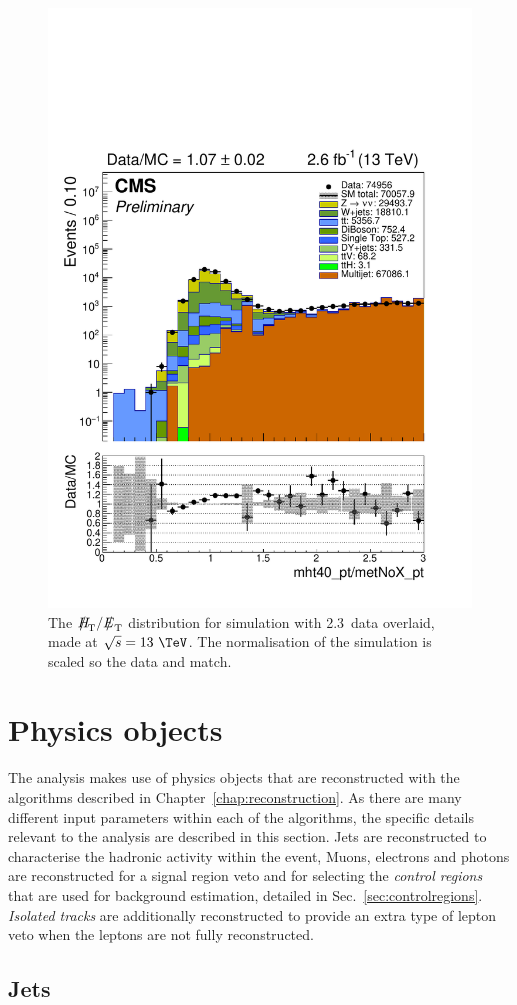 \begin{figure}
	\begin{center}
		\includegraphics[width=0.5\linewidth]{figs/analysis/eventSelection/mht40_pt_Div_metNoX_pt_all_all_80X_noOverflow_scaled0p6}%
	\end{center}
  \caption{The $\MHT/\MET$ distribution for \MC simulation with
  2.3~\ifb data overlaid, made at $\sqrt{s}=13~\tev$. The
  normalisation of the \MC simulation is scaled so the data and \MC
  match.}
	\label{fig:mhtDivMet}
\end{figure}

\section{Physics objects} %
\label{sec:physobj}

The analysis makes use of physics objects that are reconstructed with
the algorithms described in Chapter~\ref{chap:reconstruction}. As
there are many different input parameters within each of the
algorithms, the specific details relevant to the analysis are
described in this section. Jets are reconstructed to characterise the
hadronic activity within the event, Muons, electrons and photons are
reconstructed for a signal region veto and for selecting the \emph{control
regions} that are used for background estimation, detailed in
Sec.~\ref{sec:controlregions}. \emph{Isolated tracks} are additionally
reconstructed to provide an extra type of lepton veto when the leptons
are not fully reconstructed.

\subsection{Jets}
\label{sec:evSel_jets}

